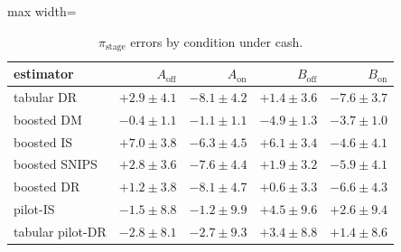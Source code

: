 \begin{table}[!htbp]
\centering
\caption{$\pi_{\mathrm{stage}}$ errors by condition under cash.}
\label{tab:campaignstage_cash}
\footnotesize
\begin{adjustbox}{max width=\linewidth}
\begin{tabular}{lrrrr}
\toprule
estimator & $A_{\mathrm{off}}$ & $A_{\mathrm{on}}$ & $B_{\mathrm{off}}$ & $B_{\mathrm{on}}$ \\
\midrule
tabular DR & $+2.9 \pm 4.1$ & $-8.1 \pm 4.2$ & $+1.4 \pm 3.6$ & $-7.6 \pm 3.7$ \\
boosted DM & $-0.4 \pm 1.1$ & $-1.1 \pm 1.1$ & $-4.9 \pm 1.3$ & $-3.7 \pm 1.0$ \\
boosted IS & $+7.0 \pm 3.8$ & $-6.3 \pm 4.5$ & $+6.1 \pm 3.4$ & $-4.6 \pm 4.1$ \\
boosted SNIPS & $+2.8 \pm 3.6$ & $-7.6 \pm 4.4$ & $+1.9 \pm 3.2$ & $-5.9 \pm 4.1$ \\
boosted DR & $+1.2 \pm 3.8$ & $-8.1 \pm 4.7$ & $+0.6 \pm 3.3$ & $-6.6 \pm 4.3$ \\
pilot-IS & $-1.5 \pm 8.8$ & $-1.2 \pm 9.9$ & $+4.5 \pm 9.6$ & $+2.6 \pm 9.4$ \\
tabular pilot-DR & $-2.8 \pm 8.1$ & $-2.7 \pm 9.3$ & $+3.4 \pm 8.8$ & $+1.4 \pm 8.6$ \\
\bottomrule
\end{tabular}
\end{adjustbox}
\end{table}
